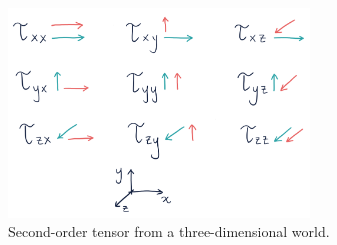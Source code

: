 \documentclass[10pt,twocolumn]{article}
\begin{document}
\begin{figure}[H]
\centering\includegraphics[width=8cm]{tensor-in-matrix-form.png}
\caption{Second-order tensor from a three-dimensional world.}
\label{fig:tensor-in-matrix-form}
\end{figure}














\vspace{5mm}


\end{document}
